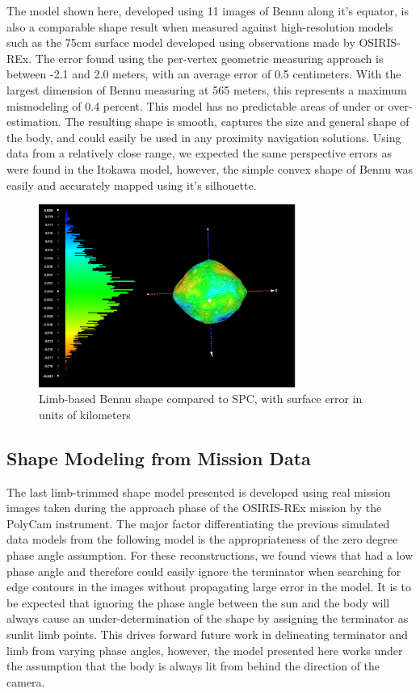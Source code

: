 The model shown here, developed using 11 images of Bennu along it's equator, is also a comparable shape result when measured against high-resolution models such as the 75cm surface model developed using observations made by OSIRIS-REx. The error found using the per-vertex geometric measuring approach is between -2.1 and 2.0 meters, with an average error of 0.5 centimeters. With the largest dimension of Bennu measuring at 565 meters, this represents a maximum mismodeling of 0.4 percent. This model has no predictable areas of under or over-estimation. The resulting shape is smooth, captures the size and general shape of the body, and could easily be used in any proximity navigation solutions. Using data from a relatively close range, we expected the same perspective errors as were found in the Itokawa model, however, the simple convex shape of Bennu was easily and accurately mapped using it's silhouette.  


\begin{figure}[h!]
    \centering
    \includegraphics[width=0.75\textwidth]{fig/bennu_sim.png}
    \caption{Limb-based Bennu shape compared to SPC, with surface error in units of kilometers}
    \label{fig:bennu_error}
\end{figure}


\subsection{Shape Modeling from Mission Data}
The last limb-trimmed shape model presented is developed using real mission images taken during the approach phase of the OSIRIS-REx mission by the PolyCam instrument. The major factor differentiating the previous simulated data models from the following model is the appropriateness of the zero degree phase angle assumption. For these reconstructions, we found views that had a low phase angle and therefore could easily ignore the terminator when searching for edge contours in the images without propagating large error in the model. It is to be expected that ignoring the phase angle between the sun and the body will always cause an under-determination of the shape by assigning the terminator as sunlit limb points. This drives forward future work in delineating terminator and limb from varying phase angles, however, the model presented here works under the assumption that the body is always lit from behind the direction of the camera. 

